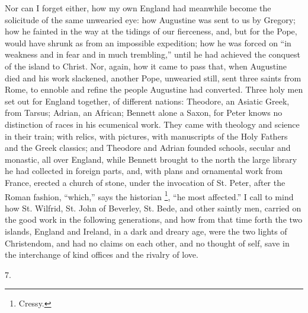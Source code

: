 Nor can I forget either, how my own England had meanwhile become
the solicitude of the same unwearied eye: how Augustine was sent
to us by Gregory; how he fainted in the way at the tidings of our
fierceness, and, but for the Pope, would have shrunk as from an
impossible expedition; how he was forced on ``in weakness and in
fear and in much trembling,'' until he had achieved the conquest
of the island to Christ. Nor, again, how it came to pass that, when
Augustine died and his work slackened, another Pope, unwearied still,
sent three saints from Rome, to ennoble and refine the people
Augustine had converted. Three holy men set out for England together,
of different nations: Theodore, an Asiatic Greek, from Tarsus; Adrian,
an African; Bennett alone a Saxon, for Peter knows no distinction of
races in his ecumenical work. They came with theology and science in
their train; with relics, with pictures, with manuscripts of the Holy
Fathers and the Greek classics; and Theodore and Adrian founded
schools, secular and monastic, all over England, while Bennett brought
to the north the large library he had collected in foreign parts, and,
with plans and ornamental work from France, erected a church of stone,
under the invocation of St. Peter, after the Roman fashion,
``which,'' says the historian \footnote{Cressy.}, ``he most affected.'' I call to mind how St. Wilfrid,
St. John of Beverley, St. Bede, and other saintly men, carried on the
good work in the following generations, and how from that time forth
the two islands, England and Ireland, in a dark and dreary age, were
the two lights of Christendom, and had no claims on each other, and no
thought of self, save in the interchange of kind offices and the
rivalry of love.

7.

